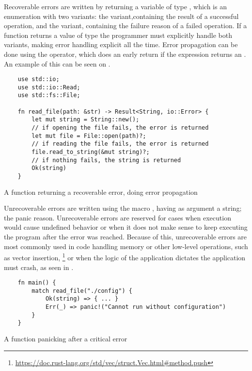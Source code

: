 Recoverable errors are written by returning a variable of type , which is an enumeration with two variants: the 
variant,containing the result of a successful operation, and the 
variant, containing the failure reason of a failed operation. If a function
returns a value of type  the programmer must explicitly
handle both variants, making error handling explicit all the time. Error
propagation can be done using the  operator, which does an early
return if the expression returns an . An example of this can be
seen on .

\begin{listing}[h]
	\begin{verbatim}
    use std::io;
    use std::io::Read;
    use std::fs::File;

    fn read_file(path: &str) -> Result<String, io::Error> {
        let mut string = String::new();
        // if opening the file fails, the error is returned
        let mut file = File::open(path)?;
        // if reading the file fails, the error is returned
        file.read_to_string(&mut string)?;
        // if nothing fails, the string is returned
        Ok(string)
    }
    \end{verbatim}
  \caption{A function returning a recoverable error, doing error propagation}
  \label{lst:recoverable_error}
\end{listing}

Unrecoverable errors are written using the macro , having as
argument a string; the panic reason. Unrecoverable errors are reserved for cases
when execution would cause undefined behavior or when it does not make sense to
keep executing the program after the error was reached. Because of this,
unrecoverable errors are most commonly used in code handling memory or other
low-level operations, such as vector insertion,
\footnote{\url{https://doc.rust-lang.org/std/vec/struct.Vec.html\#method.push}}
or when the logic of the application dictates the application must crash, as
seen in .


\begin{listing}[h]
	\begin{verbatim}
    fn main() {
        match read_file("./config") {
            Ok(string) => { ... }
            Err(_) => panic!("Cannot run without configuration")
        }
    }
    \end{verbatim}
  \caption{A function panicking after a critical error}
  \label{lst:unrecoverable_error}
\end{listing}

